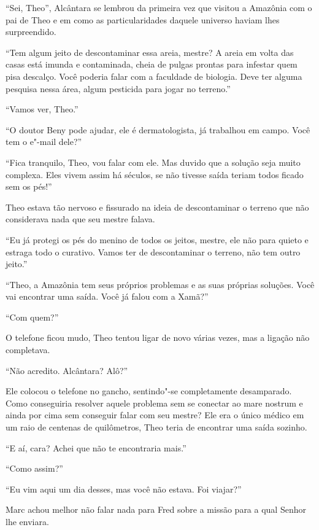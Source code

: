 ``Sei, Theo'', Alcântara se lembrou da primeira vez que visitou a
Amazônia com o pai de Theo e em como as particularidades daquele
universo haviam lhes surpreendido.

``Tem algum jeito de descontaminar essa areia, mestre? A areia em volta
das casas está imunda e contaminada, cheia de pulgas prontas para
infestar quem pisa descalço. Você poderia falar com a faculdade de
biologia. Deve ter alguma pesquisa nessa área, algum pesticida para
jogar no terreno.''

``Vamos ver, Theo.''

``O doutor Beny pode ajudar, ele é dermatologista, já trabalhou em
campo. Você tem o e"-mail dele?''

``Fica tranquilo, Theo, vou falar com ele. Mas duvido que a solução seja
muito complexa. Eles vivem assim há séculos, se não tivesse saída teriam
todos ficado sem os pés!''

Theo estava tão nervoso e fissurado na ideia de descontaminar o terreno
que não considerava nada que seu mestre falava.

``Eu já protegi os pés do menino de todos os jeitos, mestre, ele não
para quieto e estraga todo o curativo. Vamos ter de descontaminar o
terreno, não tem outro jeito.''

``Theo, a Amazônia tem seus próprios problemas e as suas próprias
soluções. Você vai encontrar uma saída. Você já falou com a Xamã?''

``Com quem?''

O telefone ficou mudo, Theo tentou ligar de novo várias vezes, mas a
ligação não completava.

``Não acredito. Alcântara? Alô?''

Ele colocou o telefone no gancho, sentindo"-se completamente desamparado.
Como conseguiria resolver aquele problema sem se conectar ao mare
nostrum e ainda por cima sem conseguir falar com seu mestre? Ele era o
único médico em um raio de centenas de quilômetros, Theo teria de
encontrar uma saída sozinho.

\asterisc


``E aí, cara? Achei que não te encontraria mais.''

``Como assim?''

``Eu vim aqui um dia desses, mas você não estava. Foi viajar?''

Marc achou melhor não falar nada para Fred sobre a missão para a qual
Senhor  lhe enviara.

